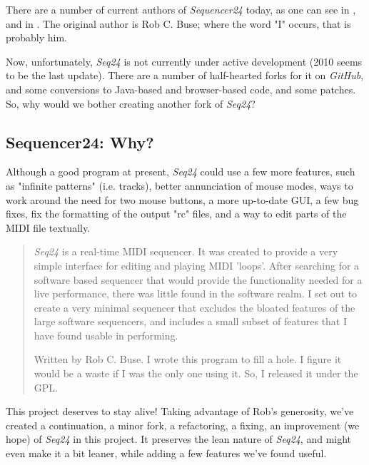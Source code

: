 \documentclass[
 11pt,
 twoside,
 a4paper,
 headinclude,
 footinclude,
 final                                 %
]{article}
\begin{document}
   There are a number of current authors of \textsl{Sequencer24} today,
   as one can see in ,
   and in .
   The original author is Rob C. Buse; where the word "I" occurs, that is
   probably him.

   Now, unfortunately, \textsl{Seq24} is not currently under active
   development (2010 seems to be the last update).  There are a number of
   half-hearted forks for it on \textsl{GitHub}, and some conversions
   to Java-based and browser-based code, and some patches.
   So, why would we bother creating another fork of \textsl{Seq24}?

\subsection{Sequencer24: Why?}
\label{subsec:introduction_seq24_vs_others}

   Although a good program at present, \textsl{Seq24} could use a few more
   features, such as "infinite patterns" (i.e. tracks), better annunciation
   of mouse modes, ways to work around the need for two mouse buttons, a more
   up-to-date GUI, a few bug fixes, fix the formatting of the output "rc"
   files, and a way to edit parts of the MIDI file textually.

   \begin{quotation}
      \textsl{Seq24} is a real-time MIDI sequencer. It was created to
      provide a very simple interface for editing and playing MIDI 'loops'.
      After searching for a software based sequencer that would provide the
      functionality needed for a live performance, there was little found in
      the software realm. I set out to create a very minimal sequencer that
      excludes the bloated features of the large software sequencers, and
      includes a small subset of features that I have found usable in
      performing. 

      Written by Rob C. Buse.  I wrote this program to fill a
      hole.  I figure it would be a waste if I was the only one
      using it.  So, I released it under the GPL.
   \end{quotation}

   This project deserves to stay alive!
   Taking advantage of Rob's generosity, we've created a continuation,
   a minor fork, a refactoring, a fixing, an improvement (we hope) of
   \textsl{Seq24} in this project.  It preserves the lean nature of
   \textsl{Seq24}, and might even make it a bit leaner, while adding a few
   features we've found useful.
   
\end{document}
